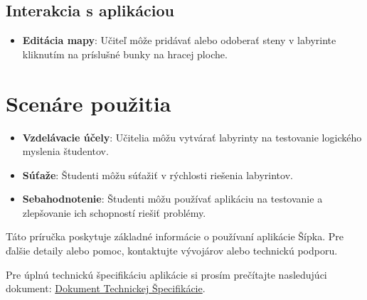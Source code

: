 \documentclass{article}
\begin{document}
\subsection*{Interakcia s aplikáciou}
\begin{itemize}
    \item \textbf{Editácia mapy}: Učiteľ môže pridávať alebo odoberať steny v labyrinte kliknutím na príslušné bunky na hracej ploche.
\end{itemize}

\section*{Scenáre použitia}
\begin{itemize}
    \item \textbf{Vzdelávacie účely}: Učitelia môžu vytvárať labyrinty na testovanie logického myslenia študentov.
    \item \textbf{Súťaže}: Študenti môžu súťažiť v rýchlosti riešenia labyrintov.
    \item \textbf{Sebahodnotenie}: Študenti môžu používať aplikáciu na testovanie a zlepšovanie ich schopností riešiť problémy.
\end{itemize}

Táto príručka poskytuje základné informácie o používaní aplikácie Šípka. Pre ďalšie detaily alebo pomoc, kontaktujte vývojárov alebo technickú podporu.

Pre úplnú technickú špecifikáciu aplikácie si prosím prečítajte nasledujúci dokument: \href{https://docs.google.com/document/d/1iO6MmWv0fqi1tS6VNDiRenPgHrlYh8M751RDV6SoXGI/edit?usp=sharing}{Dokument Technickej Špecifikácie}.
\end{document}

